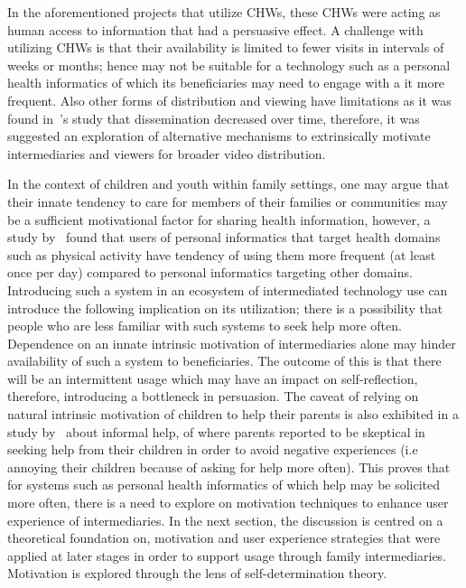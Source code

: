 In the aforementioned projects that utilize CHWs, these CHWs were acting as human access to information that had a persuasive effect. A challenge with utilizing CHWs is that their availability is limited to fewer visits in intervals of weeks or months; hence may not be suitable for a technology such as a personal health informatics of which its beneficiaries may need to engage with a it more frequent. Also other forms of distribution and viewing have limitations as it was found in~\cite{vashistha2016mobile}'s study that dissemination decreased over time, therefore, it was  suggested an exploration of alternative mechanisms  to extrinsically motivate intermediaries and viewers for broader video distribution.

In the context of children and youth within family settings, one may argue that their innate tendency to care for members of their families or communities may be a sufficient motivational factor for sharing health information, however, a study by~\cite{epstein2015lived} found that users of personal informatics that target health domains such as physical activity have tendency of using them more frequent (at least once per day) compared to personal informatics targeting other domains. Introducing such a system in an ecosystem of intermediated technology use can introduce the following implication on its utilization; there is a possibility that people who are less familiar with such systems to seek help more often. Dependence on  an innate intrinsic motivation of intermediaries alone may hinder availability of such a system to beneficiaries. The outcome of this is that there will be an intermittent usage which may have an impact on self-reflection, therefore, introducing a bottleneck in persuasion. The caveat of relying on natural intrinsic motivation of children to help their parents is also exhibited in a study by~\cite{kiesler:twi} about informal help, of where parents reported  to be skeptical in seeking help from their children in order to avoid negative experiences (i.e annoying their children because of asking for help more often). This proves that for systems such as personal health informatics of which help may be solicited more often, there is a need to explore on motivation techniques to enhance user experience of intermediaries. In the next section, the discussion is centred on a theoretical foundation on, motivation and user experience strategies that were applied at later stages in order to support usage through family intermediaries. Motivation is explored through the lens of self-determination theory.
